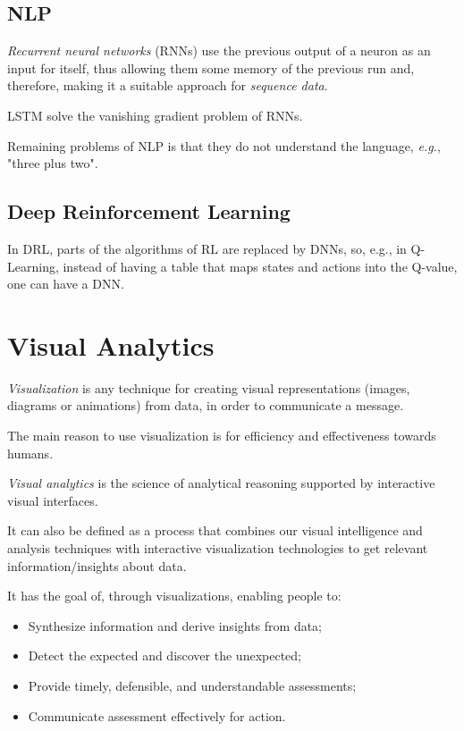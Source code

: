 \documentclass[a4paper]{report}
\begin{document}
\subsection*{NLP}


\begin{definition}
    \emph{Recurrent neural networks} (RNNs) use the previous output of a neuron as an input for itself, thus allowing them some memory of the previous run and, therefore, making it a suitable approach for \emph{sequence data}.
\end{definition}

LSTM solve the vanishing gradient problem of RNNs.

Remaining problems of NLP is that they do not understand the language, \emph{e.g.}, "three plus two".

\subsection*{Deep Reinforcement Learning}

In DRL, parts of the algorithms of RL are replaced by DNNs, so, e.g., in Q-Learning, instead of having a table that maps states and actions into the Q-value, one can have a DNN.

\section*{Visual Analytics}

\begin{definition}
    \emph{Visualization} is any technique for creating visual representations (images, diagrams or animations) from data, in order to communicate a message.
\end{definition}

The main reason to use visualization is for efficiency and effectiveness towards humans.

\begin{definition}
    \emph{Visual analytics} is the science of analytical reasoning supported by interactive visual interfaces.

    It can also be defined as a process that combines our visual intelligence and analysis techniques with interactive visualization technologies to get relevant information/insights about data.
\end{definition}

It has the goal of, through visualizations, enabling people to:
\begin{itemize}
    \item Synthesize information and derive insights from data;
    \item Detect the expected and discover the unexpected;
    \item Provide timely, defensible, and understandable assessments;
    \item Communicate assessment effectively for action.
\end{itemize}
\end{document}
